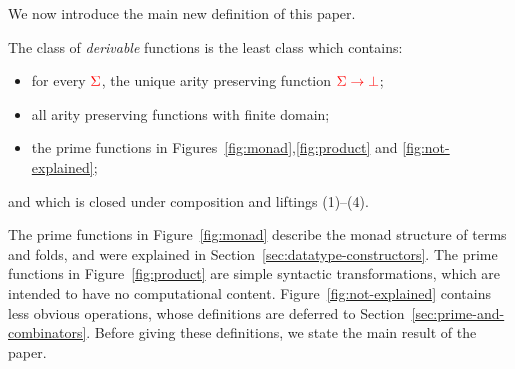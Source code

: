We now introduce the main new definition of this paper.

\begin{definition}\label{def:derivable-function}
    The class of \emph{derivable} functions is the least class which contains:
    \begin{itemize}
    \item for every ${\color{red}{\Sigma}}$, the unique arity preserving function ${\color{red}{\Sigma \to {\color{red}{\bot}}}}$;
    \item  all arity preserving functions with finite domain;
        \item  the prime functions in Figures~\ref{fig:monad},\ref{fig:product} and \ref{fig:not-explained};
         \end{itemize}
and which is closed under composition and  liftings (1)--(4).
\end{definition}

%

The prime functions in Figure~\ref{fig:monad} describe the monad structure of terms and folds, and were explained in Section~\ref{sec:datatype-constructors}. The prime functions in Figure~\ref{fig:product} are  simple syntactic transformations, which are intended to have no computational content.  Figure~\ref{fig:not-explained} contains   less obvious operations, whose definitions are  deferred to Section~\ref{sec:prime-and-combinators}. Before giving these definitions, we state the main result of the paper. 


